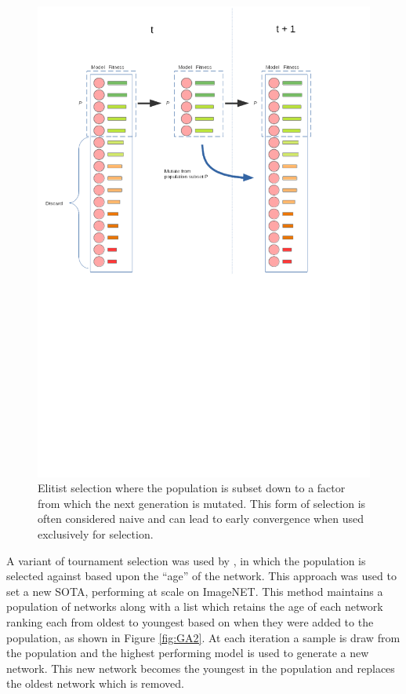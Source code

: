 	\begin{figure}[h]
	
		\centering 
		\includegraphics[trim= 100 450 100 0 ,scale=0.30]{Elite.png}


		\caption{Elitist selection where the population is subset down to a factor  from which the next generation is mutated. This form of selection is often considered naive and can lead to early convergence when used exclusively for selection.}
		\label{fig:GAX}


	\end{figure}


	A variant of tournament selection was used by \cite{42}, in which the population is selected against based upon the “age” of the network. This approach was used to set a new SOTA, performing at scale on ImageNET. This method maintains a population of networks along with a list which retains the age of each network ranking each from oldest to youngest based on when they were added to the population, as shown in Figure \ref{fig:GA2}. At each iteration a sample is draw from the population and the highest performing model is used to generate a new network. This new network becomes the youngest in the population and replaces the oldest network which is removed.



